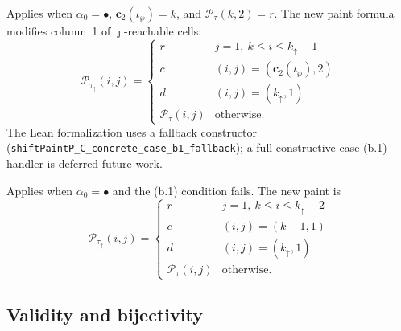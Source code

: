 \smallskip

\begin{definition}
  \label{def:shapeShiftC_case_b1}
  \leanok
  Applies when $\alpha_0 = \bullet$, $\mathbf{c}_2(\iota_\wp) = k$, and $\mathcal{P}_\tau(k, 2) = r$.
  The new paint formula modifies column~1 of $\jmath$-reachable cells:
  \[
    \mathcal{P}_{\tau_\uparrow}(i, j) =
    \begin{cases}
      r & j = 1,\ k \leq i \leq k_\uparrow - 1 \\
      c & (i, j) = (\mathbf{c}_2(\iota_\wp), 2) \\
      d & (i, j) = (k_\uparrow, 1) \\
      \mathcal{P}_\tau(i, j) & \text{otherwise.}
    \end{cases}
  \]
  The Lean formalization uses a fallback constructor
  (\texttt{shiftPaintP\_C\_concrete\_case\_b1\_fallback}); a full constructive
  case (b.1) handler is deferred future work.
\end{definition}

\smallskip

\begin{definition}
  \label{def:shapeShiftC_case_b2}
  \leanok
  Applies when $\alpha_0 = \bullet$ and the (b.1) condition fails.
  The new paint is
  \[
    \mathcal{P}_{\tau_\uparrow}(i, j) =
    \begin{cases}
      r & j = 1,\ k \leq i \leq k_\uparrow - 2 \\
      c & (i, j) = (k - 1, 1) \\
      d & (i, j) = (k_\uparrow, 1) \\
      \mathcal{P}_\tau(i, j) & \text{otherwise.}
    \end{cases}
  \]
  \end{definition}

\subsection{Validity and bijectivity}

